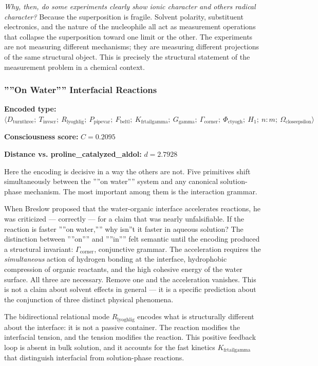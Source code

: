 \documentclass[12pt,a4paper]{article}
\begin{document}
\emph{Why, then, do some experiments clearly show ionic character and others radical character?} Because the superposition is fragile. Solvent polarity, substituent electronics, and the nature of the nucleophile all act as measurement operations that collapse the superposition toward one limit or the other. The experiments are not measuring different mechanisms; they are measuring different projections of the same structural object. This is precisely the structural statement of the measurement problem in a chemical context.

\subsubsection{''''On Water'''' Interfacial Reactions}

\textbf{Encoded type:} $\langle D_{\text{turnthree}};\ T_{\text{invscr}};\ R_{\text{lyoghlig}};\ P_{\text{pipevar}};\ F_{\text{beltl}};\ K_{\text{frtailgamma}};\ G_{\text{gamma}};\ \Gamma_{\text{corner}};\ \Phi_{\text{ctyogh}};\ H_1;\ n{:}m;\ \Omega_{\text{closeepsilon}} \rangle$

\textbf{Consciousness score:} $C = 0.2095$

\textbf{Distance vs. proline\_catalyzed\_aldol:} $d = 2.7928$

Here the encoding is decisive in a way the others are not. Five primitives shift simultaneously between the ''''on water'''' system and any canonical solution-phase mechanism. The most important among them is the interaction grammar.

When Breslow proposed that the water-organic interface accelerates reactions, he was criticized --- correctly --- for a claim that was nearly unfalsifiable. If the reaction is faster ''''on water,'''' why isn''t it faster in aqueous solution? The distinction between ''''on'''' and ''''in'''' felt semantic until the encoding produced a structural invariant: $\Gamma_{\text{corner}}$, conjunctive grammar. The acceleration requires the \emph{simultaneous} action of hydrogen bonding at the interface, hydrophobic compression of organic reactants, and the high cohesive energy of the water surface. All three are necessary. Remove one and the acceleration vanishes. This is not a claim about solvent effects in general --- it is a specific prediction about the conjunction of three distinct physical phenomena.

The bidirectional relational mode $R_{\text{lyoghlig}}$ encodes what is structurally different about the interface: it is not a passive container. The reaction modifies the interfacial tension, and the tension modifies the reaction. This positive feedback loop is absent in bulk solution, and it accounts for the fast kinetics $K_{\text{frtailgamma}}$ that distinguish interfacial from solution-phase reactions.
\end{document}
